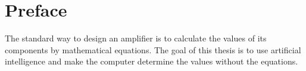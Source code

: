 \chapter{Preface}
The standard way to design an amplifier is to calculate the values of its components by mathematical equations. The goal of this thesis is to use artificial intelligence and make the computer determine the values without the equations.
